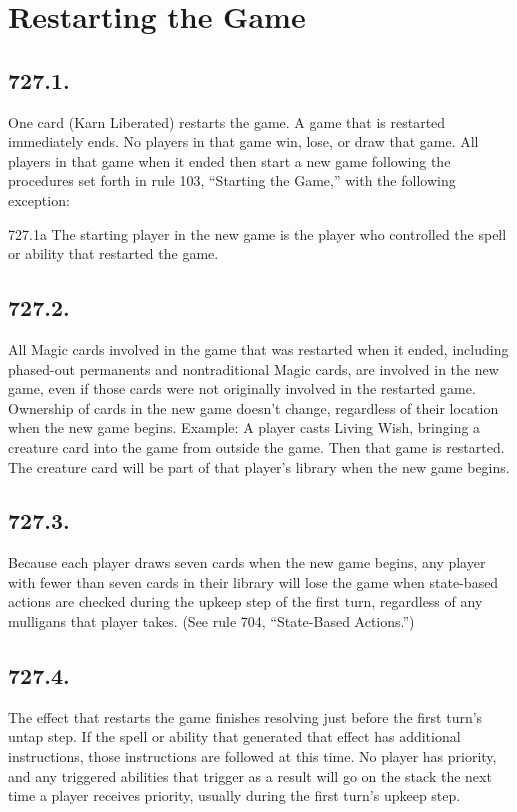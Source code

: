 \section{Restarting the Game}
\subsection*{727.1.}
One card (Karn Liberated) restarts the game. A game that is restarted immediately ends. No players in that game win, lose, or draw that game. All players in that game when it ended then start a new game following the procedures set forth in rule 103, “Starting the Game,” with the following exception:

727.1a The starting player in the new game is the player who controlled the spell or ability that restarted the game.

\subsection*{727.2.}
All Magic cards involved in the game that was restarted when it ended, including phased-out permanents and nontraditional Magic cards, are involved in the new game, even if those cards were not originally involved in the restarted game. Ownership of cards in the new game doesn’t change, regardless of their location when the new game begins.
Example: A player casts Living Wish, bringing a creature card into the game from outside the game. Then that game is restarted. The creature card will be part of that player’s library when the new game begins.

\subsection*{727.3.}
Because each player draws seven cards when the new game begins, any player with fewer than seven cards in their library will lose the game when state-based actions are checked during the upkeep step of the first turn, regardless of any mulligans that player takes. (See rule 704, “State-Based Actions.”)

\subsection*{727.4.}
The effect that restarts the game finishes resolving just before the first turn’s untap step. If the spell or ability that generated that effect has additional instructions, those instructions are followed at this time. No player has priority, and any triggered abilities that trigger as a result will go on the stack the next time a player receives priority, usually during the first turn’s upkeep step.

